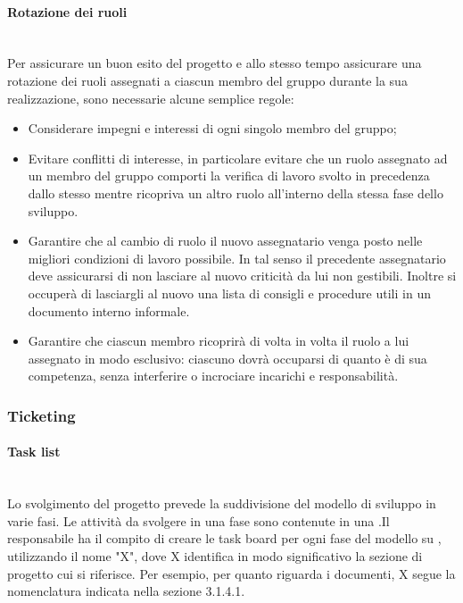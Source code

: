     \paragraph{Rotazione dei ruoli}
    ~\\Per assicurare un buon esito del progetto e allo stesso tempo assicurare una rotazione dei ruoli assegnati a ciascun membro del gruppo durante la sua realizzazione, sono necessarie alcune semplice regole:
    \begin{itemize}
        \item Considerare impegni e interessi di ogni singolo membro del gruppo;
        \item Evitare conflitti di interesse, in particolare evitare che un ruolo assegnato ad un membro del gruppo comporti la verifica di lavoro svolto in precedenza dallo stesso mentre ricopriva un altro ruolo all'interno della stessa fase dello sviluppo.
        \item Garantire che al cambio di ruolo il nuovo assegnatario venga posto nelle migliori condizioni di lavoro possibile. In tal senso il precedente assegnatario deve assicurarsi di non lasciare al nuovo criticità da lui non gestibili. Inoltre si occuperà di lasciargli al nuovo una lista di consigli e procedure utili in un documento interno informale.
        \item Garantire che ciascun membro ricoprirà di volta in volta il ruolo a lui assegnato in modo esclusivo: ciascuno dovrà occuparsi di quanto è di sua competenza, senza interferire o incrociare incarichi e responsabilità.
    \end{itemize}
    \subsubsection{Ticketing}
    
    \paragraph{Task list}
    ~\\Lo svolgimento del progetto prevede la suddivisione del modello di sviluppo in varie fasi. Le attività da svolgere in una fase sono contenute in una .Il responsabile ha il compito di creare le task board per ogni fase del modello su , utilizzando il nome "X", dove X identifica in modo significativo la sezione di progetto cui si riferisce. Per esempio, per quanto riguarda i documenti, X segue la nomenclatura indicata nella sezione 3.1.4.1. 
